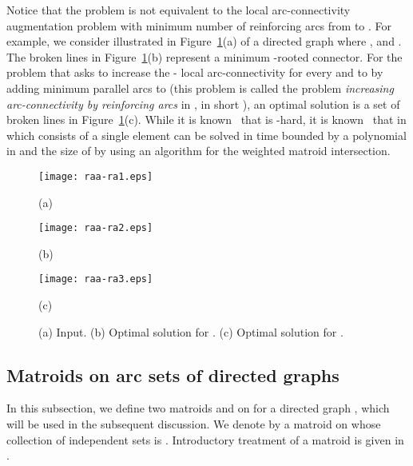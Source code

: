 \documentclass[11pt]{article}
\newcounter{ni}
\theoremstyle{plain}
\begin{document}
Notice that the problem  
is not equivalent to the local arc-connectivity augmentation problem with 
minimum number of reinforcing arcs from  to .
For example, we consider  illustrated in Figure~\ref{example_raa-ra}(a) 
of a directed graph   
where ,  and . The broken lines in Figure~\ref{example_raa-ra}(b)
represent a minimum -rooted connector. For the problem that asks to increase the - local 
arc-connectivity for every  and  to  by adding minimum 
parallel arcs to  (this problem is called the problem 
{\it increasing arc-connectivity by reinforcing arcs} in \cite{J97}, 
in short ), 
an optimal solution is a set of broken lines in Figure~\ref{example_raa-ra}(c). 
While it is known~\cite{J97} that  
is -hard, 
it is known~\cite{F06} that 
 in which  consists of a single element can be solved 
in time bounded by a polynomial in  and the size of 
by using an algorithm for the weighted matroid intersection.    

\begin{figure}[h]
\begin{minipage}{0.33\hsize}
\begin{center}
\texttt{[image: raa-ra1.eps]}
\par(a)
\end{center}
\end{minipage}
\begin{minipage}{0.32\hsize}
\begin{center}
\texttt{[image: raa-ra2.eps]}
\par(b)
\end{center}
\end{minipage}
\begin{minipage}{0.33\hsize}
\begin{center}
\texttt{[image: raa-ra3.eps]}
\par(c)
\end{center}
\end{minipage}
\caption{\small (a) Input.
(b) Optimal solution for . (c) Optimal solution for .}
\label{example_raa-ra}
\end{figure}

\subsection{Matroids on arc sets of directed graphs}

In this subsection, 
we define two matroids  and  
on  for a directed graph , 
which will be used in the subsequent discussion.
We denote by  a matroid on  whose collection of independent sets is 
. Introductory treatment of a matroid is given in \cite{O92}. 
\end{document}
